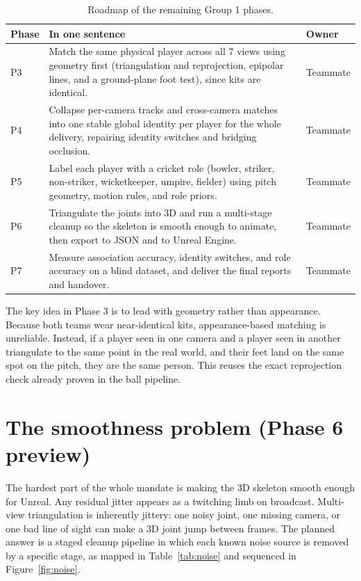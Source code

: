 \documentclass[oneside,openany]{book}
\begin{document}
\begin{table}[!h]
	\begin{center}
		\caption{Roadmap of the remaining Group 1 phases.}
		\label{tab:roadmap}
		\footnotesize
		\begin{tabular}{p{1.4cm}p{10.6cm}p{1.8cm}}
			\toprule
			\textbf{Phase} & \textbf{In one sentence} & \textbf{Owner} \\
			\midrule
			P3 & Match the same physical player across all 7 views using geometry first
			(triangulation and reprojection, epipolar lines, and a ground-plane foot test), since
			kits are identical. & Teammate \\
			P4 & Collapse per-camera tracks and cross-camera matches into one stable global
			identity per player for the whole delivery, repairing identity switches and bridging
			occlusion. & Teammate \\
			P5 & Label each player with a cricket role (bowler, striker, non-striker, wicketkeeper,
			umpire, fielder) using pitch geometry, motion rules, and role priors. & Teammate \\
			P6 & Triangulate the joints into 3D and run a multi-stage cleanup so the skeleton is
			smooth enough to animate, then export to JSON and to Unreal Engine. & Teammate \\
			P7 & Measure association accuracy, identity switches, and role accuracy on a blind
			dataset, and deliver the final reports and handover. & Teammate \\
			\bottomrule
		\end{tabular}
	\end{center}
\end{table}

The key idea in Phase 3 is to lead with geometry rather than appearance. Because both teams wear
near-identical kits, appearance-based matching is unreliable. Instead, if a player seen in one
camera and a player seen in another triangulate to the same point in the real world, and their
feet land on the same spot on the pitch, they are the same person. This reuses the exact
reprojection check already proven in the ball pipeline.

\section{The smoothness problem (Phase 6 preview)}
The hardest part of the whole mandate is making the 3D skeleton smooth enough for Unreal. Any
residual jitter appears as a twitching limb on broadcast. Multi-view triangulation is inherently
jittery: one noisy joint, one missing camera, or one bad line of sight can make a 3D joint jump
between frames. The planned answer is a staged cleanup pipeline in which each known noise source
is removed by a specific stage, as mapped in Table~\ref{tab:noise} and sequenced in
Figure~\ref{fig:noise}.
\end{document}
